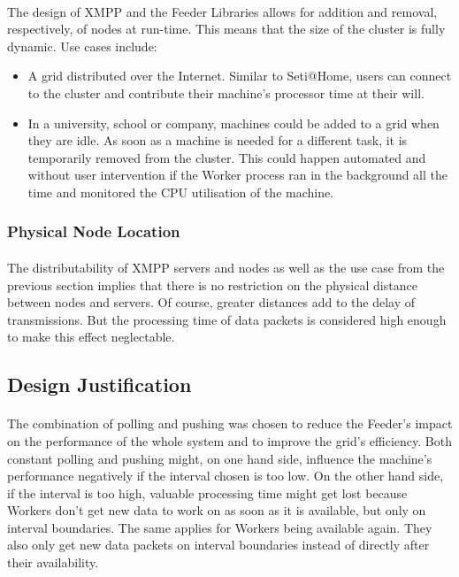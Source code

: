 \paragraph{}
The design of XMPP and the Feeder Libraries allows for addition and removal, respectively, of nodes at run-time. This means that the size of the cluster is fully dynamic. Use cases include:
\begin{itemize}
\item A grid distributed over the Internet. Similar to Seti@Home, users can connect to the cluster and contribute their machine's processor time at their will.
\item In a university, school or company, machines could be added to a grid when they are idle. As soon as a machine is needed for a different task, it is temporarily removed from the cluster. This could happen automated and without user intervention if the Worker process ran in the background all the time and monitored the CPU utilisation of the machine.
\end{itemize}

\subsubsection{Physical Node Location}
\paragraph{}
The distributability of XMPP servers and nodes as well as the use case from the previous section implies that there is no restriction on the physical distance between nodes and servers. Of course, greater distances add to the delay of transmissions. But the processing time of data packets is considered high enough to make this effect neglectable.

\subsection{Design Justification}
\label{sec:designjustification}
\paragraph{}
The combination of polling and pushing was chosen to reduce the Feeder's impact on the performance of the whole system and to improve the grid's efficiency. Both constant polling and pushing might, on one hand side, influence the machine's performance negatively if the interval chosen is too low. On the other hand side, if the interval is too high, valuable processing time might get lost because Workers don't get new data to work on as soon as it is available, but only on interval boundaries. The same applies for Workers being available again. They also only get new data packets on interval boundaries instead of directly after their availability.

